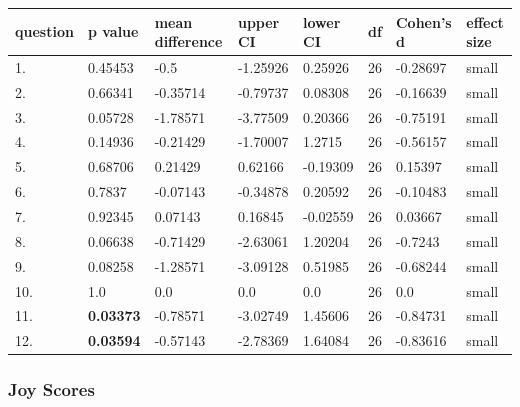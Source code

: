 \documentclass[11pt, twoside, reqno]{book}
\begin{document}
\begin{tabular}{|l|l|l|l|l|l|l|l|}
\hline
    question & p value & mean difference & upper CI & lower CI & df & Cohen's d & effect size  \\ \hline
    1. & 0.45453 & -0.5 & -1.25926 & 0.25926 & 26 & -0.28697 & small \\ \hline
    2. & 0.66341 & -0.35714 & -0.79737 & 0.08308 & 26 & -0.16639 & small  \\ \hline
    3. & 0.05728 & -1.78571 & -3.77509 & 0.20366 & 26 & -0.75191 & small  \\ \hline
    4. & 0.14936 & -0.21429 & -1.70007 & 1.2715 & 26 & -0.56157 & small \\ \hline
    5. & 0.68706 & 0.21429 & 0.62166 & -0.19309 & 26 & 0.15397 & small  \\ \hline
    6. & 0.7837 & -0.07143 & -0.34878 & 0.20592 & 26 & -0.10483 & small \\ \hline
    7. & 0.92345 & 0.07143 & 0.16845 & -0.02559 & 26 & 0.03667 & small \\ \hline
    8. & 0.06638 & -0.71429 & -2.63061 & 1.20204 & 26 & -0.7243 & small \\ \hline
    9. & 0.08258 & -1.28571 & -3.09128 & 0.51985 & 26 & -0.68244 & small \\ \hline
    10. & 1.0 & 0.0 & 0.0 & 0.0 & 26 & 0.0 & small  \\ \hline
    11. & \textbf{0.03373} & -0.78571 & -3.02749 & 1.45606 & 26 & -0.84731 & small \\ \hline
    12. & \textbf{0.03594} & -0.57143 & -2.78369 & 1.64084 & 26 & -0.83616 & small \\ \hline
\end{tabular}
\vspace{16pt}

\subsubsection{\textbf{Joy Scores}}
\end{document}

